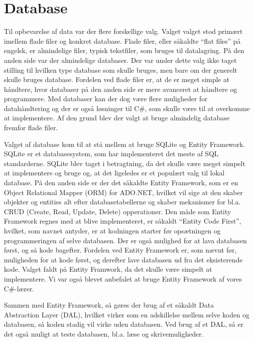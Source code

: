 \section{Database}
Til opbevarelse af data var der flere forskellige valg. Valget valget stod primært imellem flade filer og konkret database. 
Flade filer, eller såkaldte ``flat files'' på engelsk, er almindelige filer, typisk tekstfiler, som bruges til datalagring. 
På den anden side var der almindelige databaser. Der var under dette valg ikke taget stilling til hvilken type database som skulle bruges, men bare om der generelt skulle bruges database. 
Fordelen ved flade filer er, at de er meget simple at håndtere, hvor databaser på den anden side er mere avanceret at håndtere og programmere. 
Med databaser kan der dog være flere muligheder for datahåndtering og der er også løsninger til C#, som skulle være til at overkomme at implementere.\citep{flatfiles} Af den grund blev der valgt at bruge almindelig database fremfor flade filer. 

Valget af database kom til at stå mellem at bruge SQLite og Entity Framework. SQLite er et databasesystem, som har implementeret det meste af SQL standarderne.
SQLite blev taget i betragtning, da det skulle være meget simpelt at implementere og bruge og, at det ligeledes er et populært valg til lokal database. 
På den anden side er der det såkaldte Entity Framework, som er en Object Relational Mapper (ORM) for ADO.NET, hvilket vil sige at den skaber objekter og entities alt efter databasetabellerne og skaber mekanismer for bl.a. CRUD (Create, Read, Update, Delete) opperationer. \citep{entity} 
Den måde som Entity Framework regnes med at blive implementeret, er såkaldt ``Entity Code First'', hvilket, som navnet antyder, er at kodningen starter før opsætningen og programmeringen af selve databasen. Der er også mulighed for at lava databasen først, og så kode bagefter.
Fordelen ved Entity Framework er, som nævnt før, muligheden for at kode først, og derefter lave databasen ud fra det eksisterende kode. 
Valget faldt på Entity Framwork, da det skulle være simpelt at implementere. Vi var også blevet anbefalet at bruge Entity Framework af vores C#-lærer.

Sammen med Entity Framework, så gøres der brug af et såkaldt Data Abstraction Layer (DAL), hvilket virker som en adskillelse mellem selve koden og databasen, så koden stadig vil virke uden databasen. 
Ved brug af et DAL, så er det også muligt at teste databasen, bl.a. læse og skrivemuligheder. 
